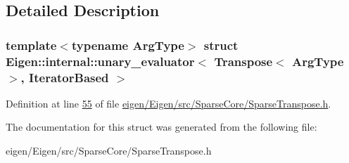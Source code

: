 \subsection{Detailed Description}
\subsubsection*{template$<$typename Arg\+Type$>$\newline
struct Eigen\+::internal\+::unary\+\_\+evaluator$<$ Transpose$<$ Arg\+Type $>$, Iterator\+Based $>$}



Definition at line \hyperlink{eigen_2_eigen_2src_2_sparse_core_2_sparse_transpose_8h_source_l00055}{55} of file \hyperlink{eigen_2_eigen_2src_2_sparse_core_2_sparse_transpose_8h_source}{eigen/\+Eigen/src/\+Sparse\+Core/\+Sparse\+Transpose.\+h}.



The documentation for this struct was generated from the following file\+:\begin{DoxyCompactItemize}
\item 
eigen/\+Eigen/src/\+Sparse\+Core/\+Sparse\+Transpose.\+h\end{DoxyCompactItemize}
